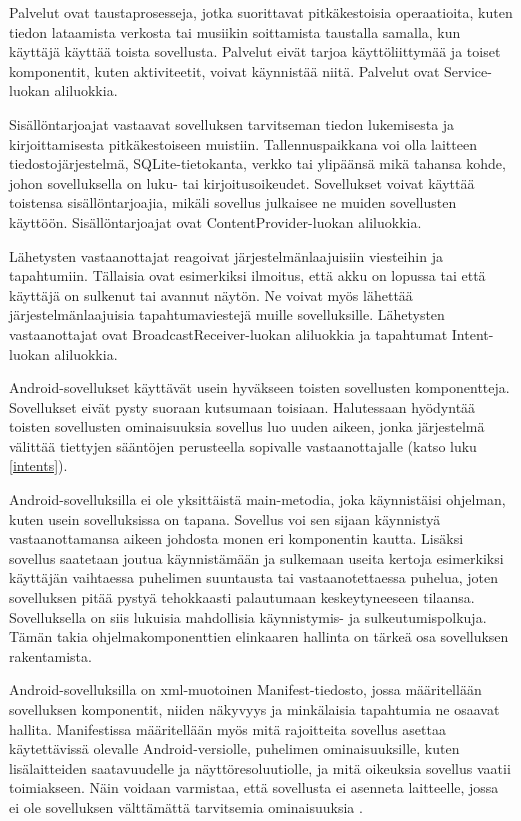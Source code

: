 Palvelut ovat taustaprosesseja, jotka suorittavat pitkäkestoisia operaatioita, kuten tiedon lataamista verkosta tai musiikin soittamista taustalla samalla, kun käyttäjä käyttää toista sovellusta. Palvelut eivät tarjoa käyttöliittymää ja toiset komponentit, kuten aktiviteetit, voivat käynnistää niitä. Palvelut ovat Service-luokan aliluokkia.

Sisällöntarjoajat vastaavat sovelluksen tarvitseman tiedon lukemisesta ja kirjoittamisesta pitkäkestoiseen muistiin. Tallennuspaikkana voi olla laitteen tiedostojärjestelmä, SQLite-tietokanta, verkko tai ylipäänsä mikä tahansa kohde, johon sovelluksella on luku- tai kirjoitusoikeudet. Sovellukset voivat käyttää toistensa sisällöntarjoajia, mikäli sovellus julkaisee ne muiden sovellusten käyttöön. Sisällöntarjoajat ovat ContentProvider-luokan aliluokkia.

Lähetysten vastaanottajat reagoivat järjestelmänlaajuisiin viesteihin ja tapahtumiin. Tällaisia ovat esimerkiksi ilmoitus, että akku on lopussa tai että käyttäjä on sulkenut tai avannut näytön. Ne voivat myös lähettää järjestelmänlaajuisia tapahtumaviestejä muille sovelluksille. Lähetysten vastaanottajat ovat BroadcastReceiver-luokan aliluokkia ja tapahtumat Intent-luokan aliluokkia.

Android-sovellukset käyttävät usein hyväkseen toisten sovellusten komponentteja. Sovellukset eivät pysty suoraan kutsumaan toisiaan. Halutessaan hyödyntää toisten sovellusten ominaisuuksia sovellus luo uuden aikeen, jonka järjestelmä välittää tiettyjen sääntöjen perusteella sopivalle vastaanottajalle (katso luku \ref{intents}). 

Android-sovelluksilla ei ole yksittäistä main-metodia, joka käynnistäisi ohjelman, kuten usein sovelluksissa on tapana. Sovellus voi sen sijaan käynnistyä vastaanottamansa aikeen johdosta monen eri komponentin kautta. Lisäksi sovellus saatetaan joutua käynnistämään ja sulkemaan useita kertoja esimerkiksi käyttäjän vaihtaessa puhelimen suuntausta tai vastaanotettaessa puhelua, joten sovelluksen pitää pystyä tehokkaasti palautumaan keskeytyneeseen tilaansa. Sovelluksella on siis lukuisia mahdollisia käynnistymis- ja sulkeutumispolkuja. Tämän takia ohjelmakomponenttien elinkaaren hallinta on tärkeä osa sovelluksen rakentamista.

Android-sovelluksilla on xml-muotoinen Manifest-tiedosto, jossa määritellään sovelluksen komponentit, niiden näkyvyys ja minkälaisia tapahtumia ne osaavat hallita. Manifestissa määritellään myös mitä rajoitteita sovellus asettaa käytettävissä olevalle Android-versiolle, puhelimen ominaisuuksille, kuten lisälaitteiden saatavuudelle ja näyttöresoluutiolle, ja mitä oikeuksia sovellus vaatii toimiakseen. Näin voidaan varmistaa, että sovellusta ei asenneta laitteelle, jossa ei ole sovelluksen välttämättä tarvitsemia ominaisuuksia \cite{android}.

